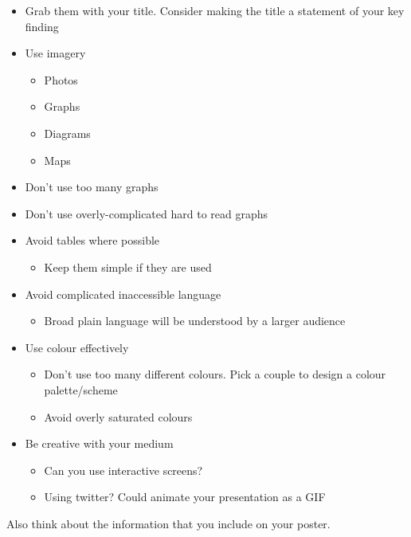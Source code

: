 \documentclass[
  titlepage]{book}
\providecommand{\tightlist}{%
  \setlength{\itemsep}{0pt}\setlength{\parskip}{0pt}}
\begin{document}
\begin{itemize}
\tightlist
\item
  Grab them with your title. Consider making the title a statement of your key finding
\item
  Use imagery

  \begin{itemize}
  \tightlist
  \item
    Photos
  \item
    Graphs
  \item
    Diagrams
  \item
    Maps
  \end{itemize}
\item
  Don't use too many graphs
\item
  Don't use overly-complicated hard to read graphs
\item
  Avoid tables where possible

  \begin{itemize}
  \tightlist
  \item
    Keep them simple if they are used
  \end{itemize}
\item
  Avoid complicated inaccessible language

  \begin{itemize}
  \tightlist
  \item
    Broad plain language will be understood by a larger audience
  \end{itemize}
\item
  Use colour effectively

  \begin{itemize}
  \tightlist
  \item
    Don't use too many different colours. Pick a couple to design a colour palette/scheme
  \item
    Avoid overly saturated colours
  \end{itemize}
\item
  Be creative with your medium

  \begin{itemize}
  \tightlist
  \item
    Can you use interactive screens?
  \item
    Using twitter? Could animate your presentation as a GIF
  \end{itemize}
\end{itemize}

Also think about the information that you include on your poster.
\end{document}
